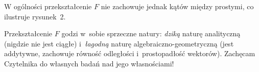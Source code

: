 		W ogólności przekształcenie $F$ nie zachowuje jednak kątów między
		prostymi, co ilustruje rysunek~2.

Przekształcenie $F$ godzi w~sobie sprzeczne natury: \emph{dziką} naturę
analityczną (nigdzie nie jest ciągłe) i~\emph{łagodną} naturę
algebraiczno-geometryczną (jest addytywne, zachowuje równość odległości
i~prostopadłość wektorów).  Zachęcam Czytelnika do własnych badań nad jego
własnościami!



